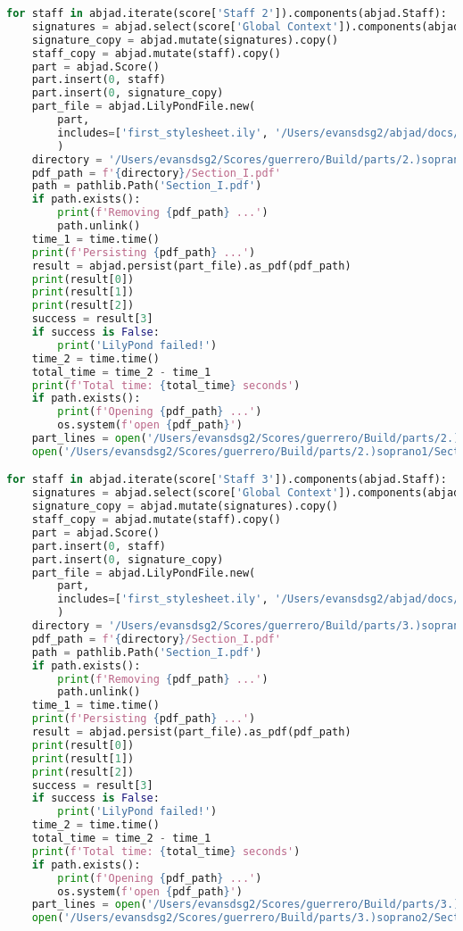 \begin{lstlisting}[language=Python, caption=Invocation Source Code]
for staff in abjad.iterate(score['Staff 2']).components(abjad.Staff):
    signatures = abjad.select(score['Global Context']).components(abjad.Staff)
    signature_copy = abjad.mutate(signatures).copy()
    staff_copy = abjad.mutate(staff).copy()
    part = abjad.Score()
    part.insert(0, staff)
    part.insert(0, signature_copy)
    part_file = abjad.LilyPondFile.new(
        part,
        includes=['first_stylesheet.ily', '/Users/evansdsg2/abjad/docs/source/_stylesheets/abjad.ily'],
        )
    directory = '/Users/evansdsg2/Scores/guerrero/Build/parts/2.)soprano1'
    pdf_path = f'{directory}/Section_I.pdf'
    path = pathlib.Path('Section_I.pdf')
    if path.exists():
        print(f'Removing {pdf_path} ...')
        path.unlink()
    time_1 = time.time()
    print(f'Persisting {pdf_path} ...')
    result = abjad.persist(part_file).as_pdf(pdf_path)
    print(result[0])
    print(result[1])
    print(result[2])
    success = result[3]
    if success is False:
        print('LilyPond failed!')
    time_2 = time.time()
    total_time = time_2 - time_1
    print(f'Total time: {total_time} seconds')
    if path.exists():
        print(f'Opening {pdf_path} ...')
        os.system(f'open {pdf_path}')
    part_lines = open('/Users/evansdsg2/Scores/guerrero/Build/parts/2.)soprano1/Section_I.ly').readlines()
    open('/Users/evansdsg2/Scores/guerrero/Build/parts/2.)soprano1/Section_I.ly', 'w').writelines(part_lines[15:-1])

for staff in abjad.iterate(score['Staff 3']).components(abjad.Staff):
    signatures = abjad.select(score['Global Context']).components(abjad.Staff)
    signature_copy = abjad.mutate(signatures).copy()
    staff_copy = abjad.mutate(staff).copy()
    part = abjad.Score()
    part.insert(0, staff)
    part.insert(0, signature_copy)
    part_file = abjad.LilyPondFile.new(
        part,
        includes=['first_stylesheet.ily', '/Users/evansdsg2/abjad/docs/source/_stylesheets/abjad.ily'],
        )
    directory = '/Users/evansdsg2/Scores/guerrero/Build/parts/3.)soprano2'
    pdf_path = f'{directory}/Section_I.pdf'
    path = pathlib.Path('Section_I.pdf')
    if path.exists():
        print(f'Removing {pdf_path} ...')
        path.unlink()
    time_1 = time.time()
    print(f'Persisting {pdf_path} ...')
    result = abjad.persist(part_file).as_pdf(pdf_path)
    print(result[0])
    print(result[1])
    print(result[2])
    success = result[3]
    if success is False:
        print('LilyPond failed!')
    time_2 = time.time()
    total_time = time_2 - time_1
    print(f'Total time: {total_time} seconds')
    if path.exists():
        print(f'Opening {pdf_path} ...')
        os.system(f'open {pdf_path}')
    part_lines = open('/Users/evansdsg2/Scores/guerrero/Build/parts/3.)soprano2/Section_I.ly').readlines()
    open('/Users/evansdsg2/Scores/guerrero/Build/parts/3.)soprano2/Section_I.ly', 'w').writelines(part_lines[15:-1])


\end{lstlisting}
